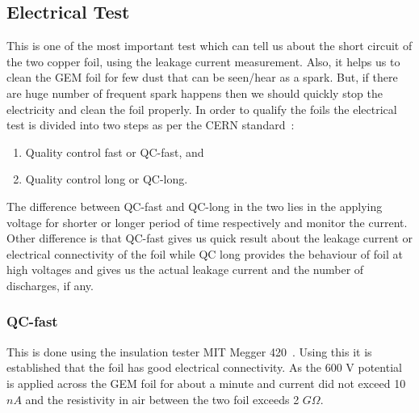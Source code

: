 \subsection{Electrical Test} %
\label{sub:electrical_test}
This is one of the most important test which can tell us about the short circuit of the two copper foil, using the leakage current measurement. Also, it helps us to clean the GEM foil for few dust that can be seen/hear as a spark. But, if there are huge number of frequent spark happens then we should quickly stop the electricity and clean the foil properly. In order to qualify the foils the electrical test is divided into two steps as per the CERN standard~\cite{Abbaneo2015}:
\begin{enumerate}
    \item Quality control fast or QC-fast, and
    \item Quality control long or QC-long.
\end{enumerate}
The difference between QC-fast and QC-long in the two lies in the applying voltage for shorter or longer period of time respectively and monitor the current. Other difference is that QC-fast gives us quick result about the leakage current or electrical connectivity of the foil while QC long provides the behaviour of foil at high voltages and gives us the actual leakage current and the number of discharges, if any.
\subsubsection{QC-fast} %
\label{ssub:qc_fast}
This is done using the insulation tester MIT Megger 420~\cite{twelve}. Using this it is established that the foil has good electrical connectivity. As the 600 V potential is applied across the GEM foil for about a minute and current did not exceed 10 $nA$ and the resistivity in air between the two foil exceeds 2 $G\Omega$.

